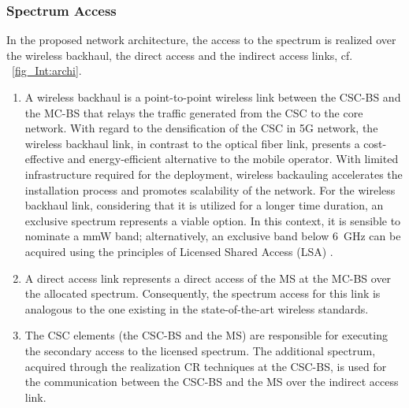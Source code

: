 \subsubsection*{Spectrum Access}
In the proposed network architecture, the access to the spectrum is realized over the wireless backhaul, the direct access and the indirect access links, cf. \figurename~\ref{fig_Int:archi}.
\begin{enumerate}
\item A wireless backhaul is a
point-to-point wireless link between the CSC-BS and the MC-BS that relays the traffic generated from the CSC to the core network. With regard to the densification of the CSC in 5G network, the wireless backhaul link, in contrast to the optical fiber link, presents a cost-effective and energy-efficient alternative to the mobile operator.
With limited infrastructure required for the deployment, wireless backauling accelerates the installation process and promotes scalability of the network.
For the wireless backhaul link, considering that it is utilized for a longer time duration, an exclusive spectrum represents a viable option. In this context, it is sensible to nominate a mmW band; alternatively, an exclusive band below \SI{6}{GHz} can be acquired using the principles of Licensed Shared Access (LSA) \cite{ETSI13}.

\item A direct access link represents a direct access of the MS at the MC-BS over the allocated spectrum. Consequently, the spectrum access for this link is analogous to the one existing in the state-of-the-art wireless standards.
\item The CSC elements (the CSC-BS and the MS) are responsible for executing the secondary access to the licensed spectrum. The additional spectrum, acquired through the realization CR techniques at the CSC-BS, is used for the communication between the CSC-BS and the MS over the indirect access link.
\end{enumerate}

